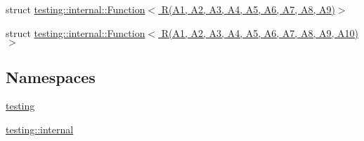 \begin{DoxyCompactItemize}
\item 
struct \hyperlink{structtesting_1_1internal_1_1_function_3_01_r_07_a1_00_01_a2_00_01_a3_00_01_a4_00_01_a5_00_01_a6dfab3ccde80824a59fc4efd5336a27c1}{testing\+::internal\+::\+Function$<$ R(\+A1, A2, A3, A4, A5, A6, A7, A8, A9)$>$}
\item 
struct \hyperlink{structtesting_1_1internal_1_1_function_3_01_r_07_a1_00_01_a2_00_01_a3_00_01_a4_00_01_a5_00_01_a6f6ff91550f0557b7708e490e5002cd35}{testing\+::internal\+::\+Function$<$ R(\+A1, A2, A3, A4, A5, A6, A7, A8, A9, A10)$>$}
\end{DoxyCompactItemize}
\subsection*{Namespaces}
\begin{DoxyCompactItemize}
\item 
 \hyperlink{namespacetesting}{testing}
\item 
 \hyperlink{namespacetesting_1_1internal}{testing\+::internal}
\end{DoxyCompactItemize}
